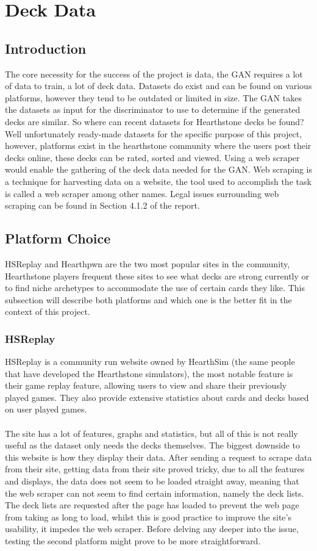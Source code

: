 \documentclass{report} %
\begin{document}
\section{Deck Data}
\subsection{Introduction}
The core necessity for the success of the project is data, the GAN requires a lot of data to train, a lot of deck data. Datasets do exist and can be found on various platforms, however they tend to be outdated or limited in size. The GAN takes the datasets as input for the discriminator to use to determine if the generated decks are similar. So where can recent datasets for Hearthstone decks be found? Well unfortunately ready-made datasets for the specific purpose of this project, however, platforms exist in the hearthstone community where the users post their decks online, these decks can be rated, sorted and viewed. Using a web scraper would enable the gathering of the deck data needed for the GAN. Web scraping is a technique for harvesting data on a website, the tool used to accomplish the task is called a web scraper among other names. Legal issues surrounding web scraping can be found in Section 4.1.2 of the report.
\subsection{Platform Choice}
HSReplay and Hearthpwn are the two most popular sites in the community, Hearthstone players frequent these sites to see what decks are strong currently or to find niche archetypes to accommodate the use of certain cards they like. This subsection will describe both platforms and which one is the better fit in the context of this project.
\subsubsection{HSReplay}
HSReplay is a community run website owned by HearthSim (the same people that have developed the Hearthstone simulators), the most notable feature is their game replay feature, allowing users to view and share their previously played games. They also provide extensive statistics about cards and decks based on user played games. \\ \\
The site has a lot of features, graphs and statistics, but all of this is not really useful as the dataset only needs the decks themselves. The biggest downside to this website is how they display their data. After sending a request to scrape data from their site, getting data from their site proved tricky, due to all the features and displays, the data does not seem to be loaded straight away, meaning that the web scraper can not seem to find certain information, namely the deck lists. The deck lists are requested after the page has loaded to prevent the web page from taking as long to load, whilst this is good practice to improve the site's usability, it impedes the web scraper.  Before delving any deeper into the issue, testing the second platform might prove to be more straightforward.
\end{document}
